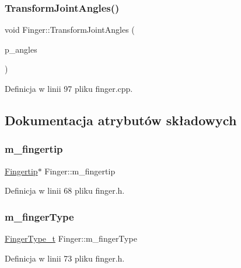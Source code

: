 \subsubsection{\texorpdfstring{Transform\+Joint\+Angles()}{TransformJointAngles()}}
{\footnotesize\ttfamily void Finger\+::\+Transform\+Joint\+Angles (\begin{DoxyParamCaption}\item[{Q\+Vector$<$ float $>$}]{p\+\_\+angles }\end{DoxyParamCaption})}



Definicja w linii 97 pliku finger.\+cpp.



\subsection{Dokumentacja atrybutów składowych}
\mbox{\label{class_finger_a50801f15bfee4cb547fa5062f6a57d78}} 
\subsubsection{\texorpdfstring{m\+\_\+fingertip}{m\_fingertip}}
{\footnotesize\ttfamily \hyperlink{class_fingertip}{Fingertip}$\ast$ Finger\+::m\+\_\+fingertip\hspace{0.3cm}{\ttfamily [protected]}}



Definicja w linii 68 pliku finger.\+h.

\mbox{\label{class_finger_aaf7978953c9c112ec568fa54c9110e41}} 
\subsubsection{\texorpdfstring{m\+\_\+finger\+Type}{m\_fingerType}}
{\footnotesize\ttfamily \hyperlink{class_finger_a365e6bba2e4877decf3c7641d29838c3}{Finger\+Type\+\_\+t} Finger\+::m\+\_\+finger\+Type\hspace{0.3cm}{\ttfamily [protected]}}



Definicja w linii 73 pliku finger.\+h.

